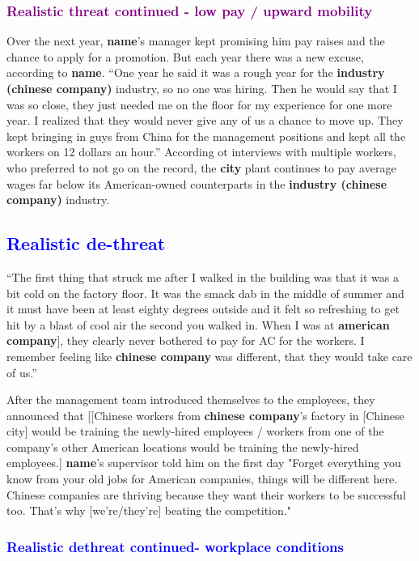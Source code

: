 \documentclass[12pt]{article}
\begin{document}
\subsubsection{\textcolor{purple}{Realistic threat continued - low pay / upward mobility}} Over the next year, \textbf{name}'s manager kept promising him pay raises and the chance to apply for a promotion. But each year there was a new excuse, according to \textbf{name}. ``One year he said it was a rough year for the \textbf{industry (chinese company)} industry, so no one was hiring. Then he would say that I was so close, they just needed me on the floor for my experience for one more year. I realized that they would never give any of us a chance to move up. They kept bringing in guys from China for the management positions and kept all the workers on 12 dollars an hour.'' According ot interviews with multiple workers, who preferred to not go on the record, the \textbf{city} plant continues to pay average wages far below its American-owned counterparts in the \textbf{industry (chinese company)} industry.


\subsection{\textcolor{blue}{Realistic de-threat}}

``The first thing that struck me after I walked in the building was that it was a bit cold on the factory floor. It was the smack dab in the middle of summer and it must have been at least eighty degrees outside and it felt so refreshing to get hit by a blast of cool air the second you walked in. When I was at \textbf{american company}], they clearly never bothered to pay for AC for the workers. I remember feeling like \textbf{chinese company} was different, that they would take care of us.''

After the management team introduced themselves to the employees, they announced that [[Chinese workers from \textbf{chinese company}'s factory in [Chinese city] would be training the newly-hired employees / workers from one of the company's other American locations would be training the newly-hired employees.] \textbf{name}'s supervisor told him on the first day "Forget everything you know from your old jobs for American companies, things will be different here. Chinese companies are thriving because they want their workers to be successful too. That's why [we're/they're] beating the competition."

\subsubsection{\textcolor{blue}{Realistic dethreat continued- workplace conditions}}
\end{document}

